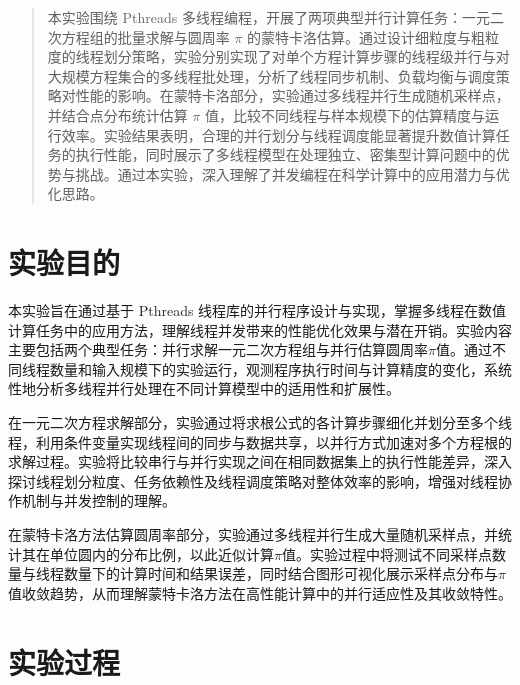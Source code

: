 \documentclass[a4paper, utf8]{ctexart}
\begin{document}
	\maketitle
	
	\renewcommand{\abstractname}{\large \textbf{摘要}}
	\begin{abstract}
		本实验围绕 Pthreads 多线程编程，开展了两项典型并行计算任务：一元二次方程组的批量求解与圆周率 $\pi$ 的蒙特卡洛估算。通过设计细粒度与粗粒度的线程划分策略，实验分别实现了对单个方程计算步骤的线程级并行与对大规模方程集合的多线程批处理，分析了线程同步机制、负载均衡与调度策略对性能的影响。在蒙特卡洛部分，实验通过多线程并行生成随机采样点，并结合点分布统计估算 $\pi$ 值，比较不同线程与样本规模下的估算精度与运行效率。实验结果表明，合理的并行划分与线程调度能显著提升数值计算任务的执行性能，同时展示了多线程模型在处理独立、密集型计算问题中的优势与挑战。通过本实验，深入理解了并发编程在科学计算中的应用潜力与优化思路。
		
	\end{abstract}
	
	\section{实验目的}
	
	本实验旨在通过基于 Pthreads 线程库的并行程序设计与实现，掌握多线程在数值计算任务中的应用方法，理解线程并发带来的性能优化效果与潜在开销。实验内容主要包括两个典型任务：并行求解一元二次方程组与并行估算圆周率$\pi$值。通过不同线程数量和输入规模下的实验运行，观测程序执行时间与计算精度的变化，系统性地分析多线程并行处理在不同计算模型中的适用性和扩展性。
	
	在一元二次方程求解部分，实验通过将求根公式的各计算步骤细化并划分至多个线程，利用条件变量实现线程间的同步与数据共享，以并行方式加速对多个方程根的求解过程。实验将比较串行与并行实现之间在相同数据集上的执行性能差异，深入探讨线程划分粒度、任务依赖性及线程调度策略对整体效率的影响，增强对线程协作机制与并发控制的理解。
	
	在蒙特卡洛方法估算圆周率部分，实验通过多线程并行生成大量随机采样点，并统计其在单位圆内的分布比例，以此近似计算$\pi$值。实验过程中将测试不同采样点数量与线程数量下的计算时间和结果误差，同时结合图形可视化展示采样点分布与$\pi$值收敛趋势，从而理解蒙特卡洛方法在高性能计算中的并行适应性及其收敛特性。
	
	\section{实验过程}
	
\end{document}
